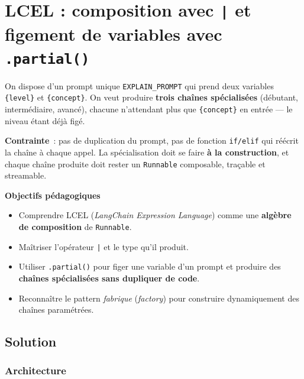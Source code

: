 \documentclass[11pt,a4paper]{article}
\begin{document}
\section{LCEL : composition avec \texttt{|} et figement de variables avec \texttt{.partial()}}

\begin{tcolorbox}[title=Exercice 3. Composition LCEL avec \texttt{|} et \texttt{.partial()}]
On dispose d'un prompt unique \texttt{EXPLAIN\_PROMPT} qui prend deux
variables \texttt{\{level\}} et \texttt{\{concept\}}. On veut produire
\textbf{trois chaînes spécialisées} (débutant, intermédiaire, avancé),
chacune n'attendant plus que \texttt{\{concept\}} en entrée — le niveau
étant déjà figé.

\textbf{Contrainte}~: pas de duplication du prompt, pas de fonction
\texttt{if/elif} qui réécrit la chaîne à chaque appel. La spécialisation
doit se faire \textbf{à la construction}, et chaque chaîne produite doit
rester un \texttt{Runnable} composable, traçable et streamable.

\bigskip
\noindent\textbf{Objectifs pédagogiques}
\begin{itemize}[leftmargin=*]
  \item Comprendre LCEL (\emph{LangChain Expression Language}) comme une
        \textbf{algèbre de composition} de \texttt{Runnable}.
  \item Maîtriser l'opérateur \texttt{|} et le type qu'il produit.
  \item Utiliser \texttt{.partial()} pour figer une variable d'un prompt et
        produire des \textbf{chaînes spécialisées sans dupliquer de code}.
  \item Reconnaître le pattern \emph{fabrique} (\emph{factory}) pour
        construire dynamiquement des chaînes paramétrées.
\end{itemize}
\end{tcolorbox}

\subsection{Solution}

\subsubsection{Architecture}
\end{document}
